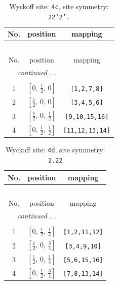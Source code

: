\documentclass[fleqn,8pt]{jsarticle}
\begin{document}
\renewcommand{\arraystretch}{1.2}
\begin{longtable}{ccc}
\caption{Wyckoff site: {\tt 4c}, site symmetry: {\tt 22'2'.}}
 \\
 \hline \hline
No. & position & mapping \\ \hline \endfirsthead

\multicolumn{2}{l}{\tablename\ \thetable{}} \\
 \hline \hline
No. & position & mapping \\ \hline \endhead

 \hline \hline
\multicolumn{2}{r}{\footnotesize\it continued ...} \\ \endfoot

 \hline \hline
\multicolumn{2}{r}{} \\ \endlastfoot

1 & $\left[ 0,\, \frac{1}{2},\, 0 \right]$ & {\tt [1,2,7,8]} \\ \hline
2 & $\left[ \frac{1}{2},\, 0,\, 0 \right]$ & {\tt [3,4,5,6]} \\ \hline
3 & $\left[ \frac{1}{2},\, 0,\, \frac{1}{2} \right]$ & {\tt [9,10,15,16]} \\ \hline
4 & $\left[ 0,\, \frac{1}{2},\, \frac{1}{2} \right]$ & {\tt [11,12,13,14]} \\
\end{longtable}
\renewcommand{\arraystretch}{1.2}
\begin{longtable}{ccc}
\caption{Wyckoff site: {\tt 4d}, site symmetry: {\tt 2.22}}
 \\
 \hline \hline
No. & position & mapping \\ \hline \endfirsthead

\multicolumn{2}{l}{\tablename\ \thetable{}} \\
 \hline \hline
No. & position & mapping \\ \hline \endhead

 \hline \hline
\multicolumn{2}{r}{\footnotesize\it continued ...} \\ \endfoot

 \hline \hline
\multicolumn{2}{r}{} \\ \endlastfoot

1 & $\left[ 0,\, \frac{1}{2},\, \frac{1}{4} \right]$ & {\tt [1,2,11,12]} \\ \hline
2 & $\left[ \frac{1}{2},\, 0,\, \frac{3}{4} \right]$ & {\tt [3,4,9,10]} \\ \hline
3 & $\left[ \frac{1}{2},\, 0,\, \frac{1}{4} \right]$ & {\tt [5,6,15,16]} \\ \hline
4 & $\left[ 0,\, \frac{1}{2},\, \frac{3}{4} \right]$ & {\tt [7,8,13,14]} \\
\end{longtable}
\end{document}
